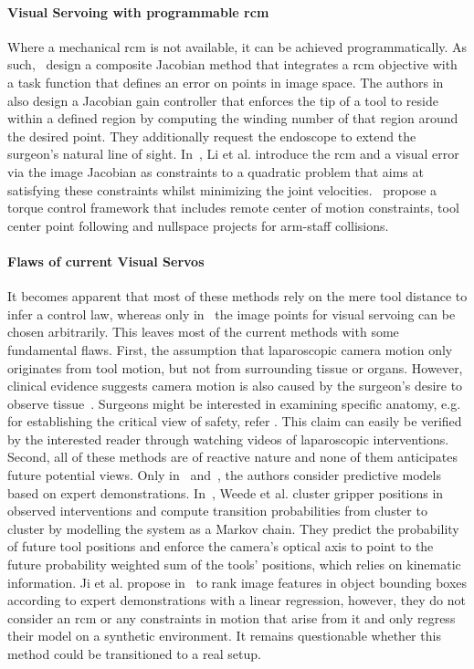 \paragraph{Visual Servoing with programmable \gls{rcm}}
Where a mechanical \gls{rcm} is not available, it can be achieved programmatically. As such,~\cite{aghakhani2013task} design a composite Jacobian method that integrates a \gls{rcm} objective with a task function that defines an error on points in image space. The authors in~\cite{yang2019adaptive} also design a Jacobian gain controller that enforces the tip of a tool to reside within a defined region by computing the winding number of that region around the desired point. They additionally request the endoscope to extend the surgeon's natural line of sight. In~\cite{li2020accelerated}, Li et al. introduce the \gls{rcm} and a visual error via the image Jacobian as constraints to a quadratic problem that aims at satisfying these constraints whilst minimizing the joint velocities.~\cite{sandoval2021towards} propose a torque control framework that includes remote center of motion constraints, tool center point following and nullspace projects for arm-staff collisions.

\paragraph{Flaws of current Visual Servos} It becomes apparent that most of these methods rely on the mere tool distance to infer a control law, whereas only in~\cite{ma2019autonomous, ma2020visual, aghakhani2013task, yang2019adaptive, li2020accelerated} the image points for visual servoing can be chosen arbitrarily. This leaves most of the current methods with some fundamental flaws. First, the assumption that laparoscopic camera motion only originates from tool motion, but not from surrounding tissue or organs. However, clinical evidence suggests camera motion is also caused by the surgeon’s desire to observe tissue~\cite{ellis2016task}. Surgeons might be interested in examining specific anatomy, e.g. for establishing the critical view of safety, refer . This claim can easily be verified by the interested reader through watching videos of laparoscopic interventions. Second, all of these methods are of reactive nature and none of them anticipates future potential views. Only in~\cite{weede2011intelligent} and~\cite{ji2018learning}, the authors consider predictive models based on expert demonstrations. In~\cite{weede2011intelligent}, Weede et al. cluster gripper positions in observed interventions and compute transition probabilities from cluster to cluster by modelling the system as a Markov chain. They predict the probability of future tool positions and enforce the camera's optical axis to point to the future probability weighted sum of the tools' positions, which relies on kinematic information. Ji et al. propose in~\cite{ji2018learning} to rank image features in object bounding boxes according to expert demonstrations with a linear regression, however, they do not consider an \gls{rcm} or any constraints in motion that arise from it and only regress their model on a synthetic environment. It remains questionable whether this method could be transitioned to a real setup.

